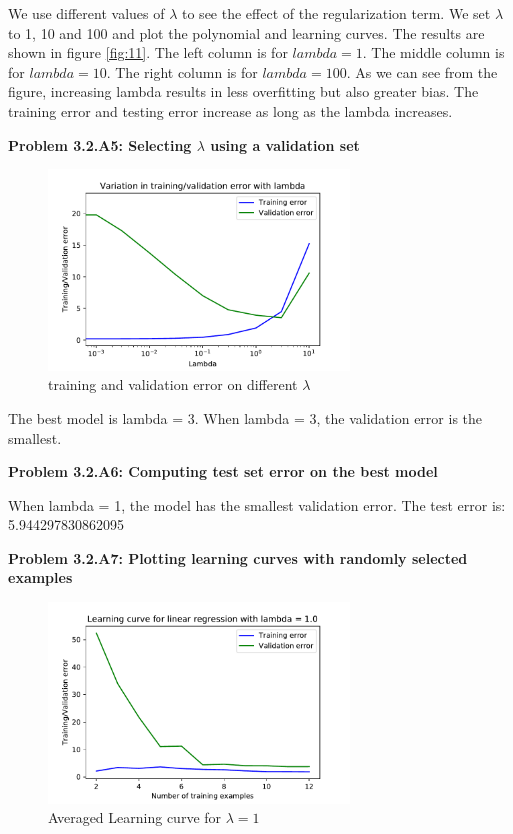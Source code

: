 \documentclass[]{book}
\theoremstyle{definition}
\begin{document}
\begin{flushleft}
	We use different values of $\lambda$ to see the effect of the regularization term. We set $\lambda$ to 1, 10 and 100 and plot the polynomial and learning curves. The results are shown in figure \ref{fig:11}. The left column is for $lambda = 1$. The middle column is for $lambda = 10$. The right column is for $lambda = 100$. As we can see from the figure, increasing lambda results in less overfitting but also greater bias. The training error and testing error increase as long as the lambda increases.
\end{flushleft}
\textbf{Problem 3.2.A5: Selecting $\lambda$ using a validation set}
\begin{figure}[H]
	\centering
	\includegraphics[width=8cm]{fig10to11.pdf}
	\caption{training and validation error on different $\lambda$}
	\label{fig:12}
\end{figure}
\begin{flushleft}
	The best model is lambda = 3. When lambda = 3, the validation error is the smallest. 
\end{flushleft}
\textbf{Problem 3.2.A6: Computing test set error on the best model}
\begin{flushleft}
	When lambda = 1, the model has the smallest validation error. The test error is: 5.944297830862095
\end{flushleft}
\textbf{Problem 3.2.A7: Plotting learning curves with randomly selected examples}
\begin{figure}[H]
	\centering
	\includegraphics[width=8cm]{fig11.pdf}
	\caption{Averaged Learning curve for $\lambda = 1$}
	\label{fig:13}
\end{figure}
\end{document}
